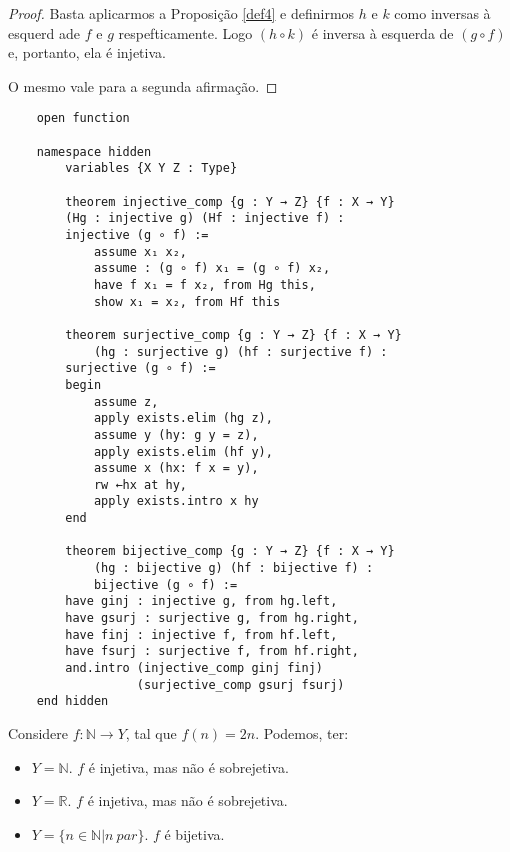 \begin{proof}
    Basta aplicarmos a Proposição \ref{def4} e definirmos $h$ e $k$ como
    inversas à esquerd ade $f$ e $g$ respefticamente. Logo $(h \circ k)$
    é inversa à esquerda de  $(g \circ f)$ e, portanto, ela é injetiva.

    O mesmo vale para a segunda afirmação.
\end{proof}

\begin{lstlisting}
    open function

    namespace hidden
        variables {X Y Z : Type}

        theorem injective_comp {g : Y → Z} {f : X → Y}
        (Hg : injective g) (Hf : injective f) :
        injective (g ∘ f) :=
            assume x₁ x₂,
            assume : (g ∘ f) x₁ = (g ∘ f) x₂,
            have f x₁ = f x₂, from Hg this,
            show x₁ = x₂, from Hf this

        theorem surjective_comp {g : Y → Z} {f : X → Y}
            (hg : surjective g) (hf : surjective f) :
        surjective (g ∘ f) :=
        begin
            assume z,
            apply exists.elim (hg z),
            assume y (hy: g y = z),
            apply exists.elim (hf y),
            assume x (hx: f x = y),
            rw ←hx at hy,
            apply exists.intro x hy
        end

        theorem bijective_comp {g : Y → Z} {f : X → Y}
            (hg : bijective g) (hf : bijective f) :
            bijective (g ∘ f) :=
        have ginj : injective g, from hg.left,
        have gsurj : surjective g, from hg.right,
        have finj : injective f, from hf.left,
        have fsurj : surjective f, from hf.right,
        and.intro (injective_comp ginj finj)
                  (surjective_comp gsurj fsurj)
    end hidden
\end{lstlisting}

\begin{example}
    Considere $f: \mathbb{N} \to Y$, tal que $f(n) = 2n$. Podemos, ter:
    \begin{itemize}
        \item $Y = \mathbb{N}$. $f$ é injetiva, mas não é sobrejetiva.
        \item $Y = \mathbb{R}$. $f$ é injetiva, mas não é sobrejetiva.
        \item $Y = \{n \in \mathbb{N} | n~par\}$. $f$ é bijetiva.
    \end{itemize}
\end{example}

